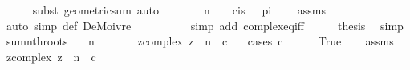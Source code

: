 \begin{isabellebody}
\ \ \ \ \isamarkupfalse%
\ {\isacharparenleft}{\kern0pt}subst\ geometric{\isacharunderscore}{\kern0pt}sum{\isacharparenright}{\kern0pt}\ auto\isanewline
\ \ \isamarkupfalse%
\ \isamarkupfalse%
\ {\isachardoublequoteopen}{\isasymomega}\ {\isacharcircum}{\kern0pt}\ n\ {\isacharminus}{\kern0pt}\ {}\ {\isacharequal}{\kern0pt}\ cis\ {\isacharparenleft}{\kern0pt}{}\ {\isacharasterisk}{\kern0pt}\ pi{\isacharparenright}{\kern0pt}\ {\isacharminus}{\kern0pt}\ {}{\isachardoublequoteclose}\ \isamarkupfalse%
\ assms\ \isamarkupfalse%
\ {\isacharparenleft}{\kern0pt}auto\ simp{\isacharcolon}{\kern0pt}\ {\isasymomega}{\isacharunderscore}{\kern0pt}def\ DeMoivre{\isacharparenright}{\kern0pt}\isanewline
\ \ \isamarkupfalse%
\ \isamarkupfalse%
\ {\isachardoublequoteopen}{\isasymdots}\ {\isacharequal}{\kern0pt}\ {}{\isachardoublequoteclose}\ \isamarkupfalse%
\ {\isacharparenleft}{\kern0pt}simp\ add{\isacharcolon}{\kern0pt}\ complex{\isacharunderscore}{\kern0pt}eq{\isacharunderscore}{\kern0pt}iff{\isacharparenright}{\kern0pt}\isanewline
\ \ \isamarkupfalse%
\ \isamarkupfalse%
\ {\isacharquery}{\kern0pt}thesis\ \isamarkupfalse%
\ simp\isanewline
{}\isamarkupfalse%
%
\endisatagproof
{\isafoldproof}%
%
\isadelimproof
\isanewline
%
\endisadelimproof
\isanewline
{}\isamarkupfalse%
\ sum{\isacharunderscore}{\kern0pt}nth{\isacharunderscore}{\kern0pt}roots{\isacharcolon}{\kern0pt}\isanewline
\ \ \ {\isachardoublequoteopen}n\ {\isachargreater}{\kern0pt}\ {}{\isachardoublequoteclose}\isanewline
\ \ \ \ \ {\isachardoublequoteopen}{\isasymSum}{\isacharbraceleft}{\kern0pt}z{\isacharcolon}{\kern0pt}{\isacharcolon}{\kern0pt}complex{\isachardot}{\kern0pt}\ z\ {\isacharcircum}{\kern0pt}\ n\ {\isacharequal}{\kern0pt}\ c{\isacharbraceright}{\kern0pt}\ {\isacharequal}{\kern0pt}\ {}{\isachardoublequoteclose}\isanewline
%
\isadelimproof
%
\endisadelimproof
%
\isatagproof
{}\isamarkupfalse%
\ {\isacharparenleft}{\kern0pt}cases\ {\isachardoublequoteopen}c\ {\isacharequal}{\kern0pt}\ {}{\isachardoublequoteclose}{\isacharparenright}{\kern0pt}\isanewline
\ \ \isamarkupfalse%
\ True\isanewline
\ \ \isamarkupfalse%
\ assms\ \isamarkupfalse%
\ {\isachardoublequoteopen}{\isacharbraceleft}{\kern0pt}z{\isacharcolon}{\kern0pt}{\isacharcolon}{\kern0pt}complex{\isachardot}{\kern0pt}\ z\ {\isacharcircum}{\kern0pt}\ n\ {\isacharequal}{\kern0pt}\ c{\isacharbraceright}{\kern0pt}\ {\isacharequal}{\kern0pt}\ {\isacharbraceleft}{\kern0pt}{}{\isacharbraceright}{\kern0pt}{\isachardoublequoteclose}\ \isamarkupfalse%

\end{isabellebody}
